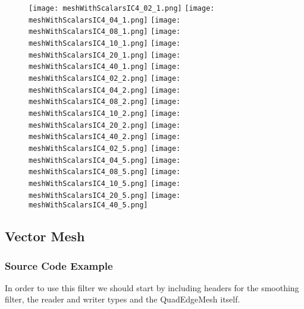 \documentclass{InsightArticle}
\begin{document}
\begin{figure}
\center
\texttt{[image: meshWithScalarsIC4\_02\_1.png]}
\texttt{[image: meshWithScalarsIC4\_04\_1.png]}
\texttt{[image: meshWithScalarsIC4\_08\_1.png]}
\texttt{[image: meshWithScalarsIC4\_10\_1.png]}
\texttt{[image: meshWithScalarsIC4\_20\_1.png]}
\texttt{[image: meshWithScalarsIC4\_40\_1.png]}
\texttt{[image: meshWithScalarsIC4\_02\_2.png]}
\texttt{[image: meshWithScalarsIC4\_04\_2.png]}
\texttt{[image: meshWithScalarsIC4\_08\_2.png]}
\texttt{[image: meshWithScalarsIC4\_10\_2.png]}
\texttt{[image: meshWithScalarsIC4\_20\_2.png]}
\texttt{[image: meshWithScalarsIC4\_40\_2.png]}
\texttt{[image: meshWithScalarsIC4\_02\_5.png]}
\texttt{[image: meshWithScalarsIC4\_04\_5.png]}
\texttt{[image: meshWithScalarsIC4\_08\_5.png]}
\texttt{[image: meshWithScalarsIC4\_10\_5.png]}
\texttt{[image: meshWithScalarsIC4\_20\_5.png]}
\texttt{[image: meshWithScalarsIC4\_40\_5.png]}
\label{fig:ScalarIC4Smoothings}
\end{figure}

\clearpage

\subsection{Vector Mesh}

\subsubsection{Source Code Example}

In order to use this filter we should start by including headers for the
smoothing filter, the reader and writer types and the QuadEdgeMesh itself.

\begin{center}

\end{center}
\end{document}
